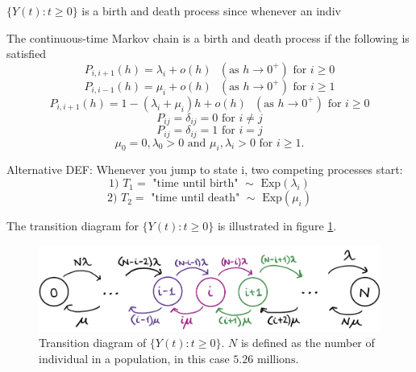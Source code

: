 $\{Y(t):t \geq 0\}$ is a birth and death process since whenever an indiv


The continuous-time Markov chain is a birth and death process if the following is satisfied
$$P_{i, i+1}(h) = \lambda_i + o(h) \text{ }(\text{as } h\rightarrow 0^+) \text{ for } i \geq 0$$
$$P_{i, i-1}(h) = \mu_i + o(h) \text{ }(\text{as } h\rightarrow 0^+) \text{ for } i \geq 1$$
$$P_{i, i+1}(h) = 1 - (\lambda_i + \mu_i)h+ o(h) \text{ }(\text{as } h\rightarrow 0^+) \text{ for } i \geq 0$$
$$ P_{ij} = \delta_{ij} = 0 \text{ for } i \neq j $$
$$ P_{ij} = \delta_{ij} = 1 \text{ for } i = j $$
$$\mu_0 = 0, \lambda_0 > 0\text{ and } \mu_i, \lambda_i > 0 \text{ for } i\geq1.$$

Alternative DEF:
Whenever you jump to state i, two competing processes start: 
$$\text{1) } T_1  = \text{ "time until birth" } \sim \text{ Exp}(\lambda_i)$$
$$\text{2) } T_2 = \text{ "time until death" } \sim \text{ Exp}(\mu_i)$$

The transition diagram for $\{Y(t): t\geq 0\}$ is illustrated in figure \ref{transdiagramY}.

\begin{figure}
    \centering
    \includegraphics[width=140mm]{TransDiag1F.png}
    \caption{Transition diagram of $\{Y(t):t \geq 0 \}$. $N$ is defined as the number of individual in a population, in this case $5.26 \text{ millions.}$}
    \label{transdiagramY}
\end{figure}